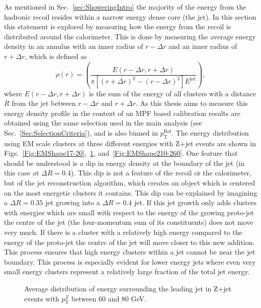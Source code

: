 As mentioned in Sec.~\ref{sec:ShoweringIntro} the majority of the energy from the hadronic recoil resides within a narrow energy dense core (the jet).  
In this section this statement is explored by measuring how the energy from the recoil is distributed around the calorimeter.  
This is done by measuring the average energy density in an annulus with an inner radius of $r-\Delta r$ and an inner radius of $r+\Delta r$, which is defined as
\begin{equation}
  \rho\left(r\right)  = \left( \frac{ E\left(r-\Delta r, r+\Delta r\right)}{\pi \left[\left(r +\Delta r\right)^2-\left(r -\Delta r\right)^2\right] E^{\mathrm{jet}}}\right), 
\end{equation}
where $E\left(r-\Delta r, r+\Delta r\right)$ is the sum of the energy of all clusters with a distance $R$ from the jet between $r-\Delta r$ and  $r+\Delta r$.  
As this thesis aims to measure this energy density profile in the context of an MPF based calibration results are obtained using the same selection used in the main analysis (see Sec.~\ref{Sec:SelectionCriteria}), and is also binned in $p_{\mathrm T}^{\mathrm{Ref}}$.  
The energy distribution using EM scale clusters at three different energies with Z+jet events are shown in Figs.~\ref{Fig:EMShape17-20},~\ref{Fig:EMShape60-80}, and~\ref{Fig:EMShape210-260}.  
One feature that should be understood is a dip in energy density at the boundary of the jet (in this case at $\Delta R = 0.4$).  
This dip is not a feature of the recoil or the calorimeter, but of the jet reconstruction algorithm, which creates an object which is centered on the most energetic clusters it contains.  
This dip can be explained by imagining a $\Delta R = 0.35$ jet growing into a $\Delta R = 0.4$ jet.  
If this jet growth only adds clusters with energies which are small with respect to the energy of the growing proto-jet the centre of the jet (the four-momentum sum of its constituents) does not move very much.  
If there is a cluster with a relatively high energy compared to the energy of the proto-jet the centre of the jet will move closer to this new addition.  
This process ensures that high energy clusters within a jet cannot be near the jet boundary.  
This process is especially evident for lower energy jets where even very small energy clusters represent a relatively large fraction of the total jet energy.  


\begin{figure}[!ht]
 \begin{center}
 \end{center}
 \caption[Recoil energy distribution in Z+jet, 60-80 GeV]
 {\small Average distribution of energy surrounding the leading jet in Z+jet events with $p_{\mathrm T}^{Z}$ between 60 and 80 GeV. }
 \label{Fig:EMShape60-80}
\end{figure}

